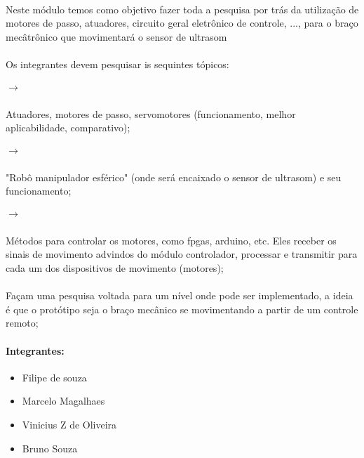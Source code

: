 \documentclass[a4paper]{article}
\begin{document}
\paragraph{} Neste módulo temos como objetivo fazer toda a pesquisa por trás da utilização de motores de passo, atuadores, circuito geral eletrônico de controle, ..., para o braço mecâtrônico que movimentará o sensor de ultrasom

\paragraph{} Os integrantes devem pesquisar is sequintes tópicos: 
\subparagraph{$\rightarrow$} Atuadores, motores de passo, servomotores (funcionamento, melhor aplicabilidade, comparativo);
\subparagraph{$\rightarrow$} "Robô manipulador esférico" (onde será encaixado o sensor de ultrasom) e seu funcionamento; 
\subparagraph{$\rightarrow$} Métodos para controlar os motores, como fpgas, arduino, etc. Eles receber os sinais de movimento advindos do módulo controlador, processar e transmitir para cada um dos dispositivos de movimento (motores);

\paragraph{} Façam uma pesquisa voltada para um nível onde pode ser implementado, a ideia é que o protótipo seja o braço mecânico se movimentando a partir de um controle remoto;

\paragraph{Integrantes:}
\begin{itemize}
\item Filipe de souza 
\item Marcelo Magalhaes
\item Vinicius Z de Oliveira
\item Bruno Souza
\end{itemize}
\end{document}
